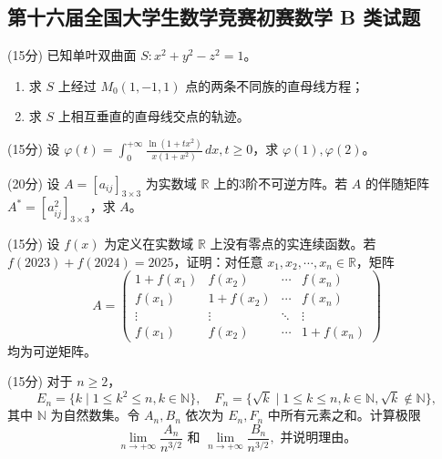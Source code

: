 \documentclass[loose]{ExBook}
\begin{document}
\subsection{第十六届全国大学生数学竞赛初赛数学 B 类试题}
\begin{qitems}

    \begin{bbox}
        \qitem (15分) 已知单叶双曲面 \( S: x^2 + y^2 - z^2 = 1 \)。
        \begin{enumerate}[label=(\arabic*)]
            \item 求 \( S \) 上经过 \( M_0 (1, -1, 1) \) 点的两条不同族的直母线方程；
            \item 求 \( S \) 上相互垂直的直母线交点的轨迹。
        \end{enumerate}
    \end{bbox}

    \begin{bbox}
        \qitem (15分) 设 \(\varphi(t) = \int_{0}^{+\infty} \frac{\ln(1+tx^2)}{x(1+x^2)} \, dx, t \geq 0\)，求 \(\varphi(1), \varphi(2)\)。
    \end{bbox}

    \begin{bbox}
        \qitem (20分) 设 \( A = [a_{ij}]_{3 \times 3} \) 为实数域 \( \mathbb{R} \) 上的3阶不可逆方阵。若 \( A \) 的伴随矩阵 \( A^* = [a_{ij}^2]_{3 \times 3} \)，求 \( A \)。
    \end{bbox}

    \begin{bbox}
        \qitem (15分) 设 \( f(x) \) 为定义在实数域 \( \mathbb{R} \) 上没有零点的实连续函数。若 \( f(2023) + f(2024) = 2025 \)，证明：对任意 \( x_1, x_2, \cdots, x_n \in \mathbb{R} \)，矩阵
        \[
        A = 
        \begin{pmatrix}
        1 + f(x_1) & f(x_2) & \cdots & f(x_n) \\
        f(x_1) & 1 + f(x_2) & \cdots & f(x_n) \\
        \vdots & \vdots & \ddots & \vdots \\
        f(x_1) & f(x_2) & \cdots & 1 + f(x_n)
        \end{pmatrix}
        \]
        均为可逆矩阵。
    \end{bbox}

    \begin{bbox}
        \qitem (15分) 对于 \( n \geq 2 \)，
        \[
        E_n = \{ k \mid 1 \leq k^2 \leq n, k \in \mathbb{N} \}, \quad F_n = \{ \sqrt{k} \mid 1 \leq k \leq n, k \in \mathbb{N}, \sqrt{k} \notin \mathbb{N} \},
        \]
        其中 \( \mathbb{N} \) 为自然数集。令 \( A_n, B_n \) 依次为 \( E_n, F_n \) 中所有元素之和。计算极限
        \[
        \lim_{n \to +\infty} \frac{A_n}{n^{3/2}} \text{ 和 } \lim_{n \to +\infty} \frac{B_n}{n^{3/2}}, \text{ 并说明理由。}
        \]
    \end{bbox}


\end{qitems}
\end{document}
